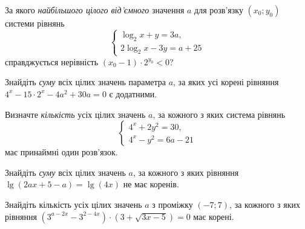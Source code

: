 \documentclass[12pt]{article}
\begin{document}
\begin{samepage}
\noindent\zadnum За якого \textit{найбільшого цілого від'ємного} значення $a$ для розв'язку $(x_0; y_0)$ системи рівнянь
$$
\begin{cases}
\log_2 x + y = 3a, \\
2\log_2 x - 3y = a + 25
\end{cases}
$$
справджується нерівність $(x_0 - 1) \cdot 2^{y_0} < 0$? 

\nmtnobreak
\nopagebreak\nbvspace{0.3cm}
\nmtAnswerBox
\par{}
\end{samepage}

\begin{samepage}
\noindent\zadnum Знайдіть \textit{суму} всіх цілих значень параметра $a$, за яких усі корені рівняння $4^x - 15 \cdot 2^x - 4a^2 + 30a = 0$ є додатними. 

\nmtnobreak
\nopagebreak\nbvspace{0.3cm}
\nmtAnswerBox
\par{}
\end{samepage}

\begin{samepage}
\noindent\zadnum Визначте \textit{кількість} усіх цілих значень $a$, за кожного з яких система рівнянь
$$
\begin{cases}
4^x + 2y^2 = 30, \\
4^x - y^2 = 6a - 21
\end{cases}
$$
має принаймні один розв'язок. 

\nmtnobreak
\nopagebreak\nbvspace{0.3cm}
\nmtAnswerBox
\par{}
\end{samepage}

\begin{samepage}
\noindent\zadnum Знайдіть \textit{суму} всіх цілих значень $a$, за кожного з яких рівняння $\lg(2ax + 5 - a) = \lg(4x)$ не має коренів. 

\nmtnobreak
\nopagebreak\nbvspace{0.3cm}
\nmtAnswerBox
\par{}
\end{samepage}

\begin{samepage}
\noindent\zadnum Знайдіть кількість усіх цілих значень $a$ з проміжку $(-7; 7)$, за кожного з яких рівняння $(3^{a - 2x} - 3^{2 - 4x}) \cdot (3 + \sqrt{3x - 5}) = 0$ має корені. 

\nmtnobreak
\nopagebreak\nbvspace{0.3cm}
\nmtAnswerBox
\par{}
\end{samepage}
\end{document}
